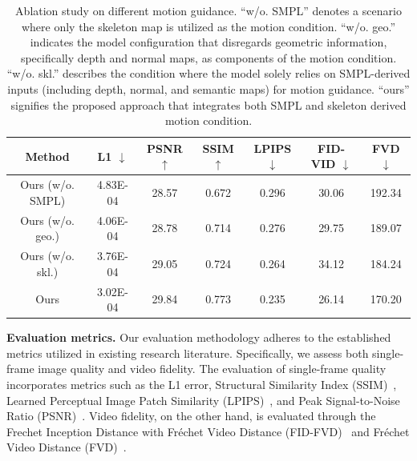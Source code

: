 \begin{table}[!t]
\centering
\begin{tabular}{c|cccc|cc}
\hline
Method          & L1 $\downarrow$ & PSNR $\uparrow$ & SSIM $\uparrow$ & LPIPS $\downarrow$  & FID-VID $\downarrow$ & FVD $\downarrow$ \\ \hline
Ours (w/o. SMPL)  & 4.83E-04        & 28.57           & 0.672           & 0.296                  & 30.06                & 192.34          \\

Ours (w/o. geo.)  & 4.06E-04    & 28.78          & 0.714           & 0.276                        & 29.75                & 189.07           \\
Ours (w/o. skl.) & 3.76E-04            & 29.05            & 0.724             & 0.264            & 34.12                               & 184.24 \\
Ours & 3.02E-04          & 29.84           & 0.773            & 0.235          &  26.14                  & 170.20            \\\hline
\end{tabular}
\vspace{1mm}
\caption{Ablation study on different motion guidance.
``w/o. SMPL'' denotes a scenario where only the skeleton map is utilized as the motion condition.
``w/o. geo.'' indicates the model configuration that disregards geometric information, specifically depth and normal maps, as components of the motion condition.
``w/o. skl.'' describes the condition where the model solely relies on SMPL-derived inputs (including depth, normal, and semantic maps) for motion guidance.
``ours'' signifies the proposed approach that integrates both SMPL and skeleton derived motion condition.
}
\vspace{-4mm}
\label{tab:guidance_ablation}
\end{table}

\textbf{Evaluation metrics.} 
Our evaluation methodology adheres to the established metrics utilized in existing research literature.
Specifically, we assess both single-frame image quality and video fidelity. 
The evaluation of single-frame quality incorporates metrics such as the L1 error, Structural Similarity Index (SSIM)~\cite{wang2004image}, Learned Perceptual Image Patch Similarity (LPIPS)~\cite{zhang2018unreasonable}, and Peak Signal-to-Noise Ratio (PSNR)~\cite{5596999}. 
Video fidelity, on the other hand, is evaluated through the Frechet Inception Distance with Fréchet Video Distance (FID-FVD)~\cite{ijcai2019p276} and Fréchet Video Distance (FVD)~\cite{unterthiner2018towards}.

